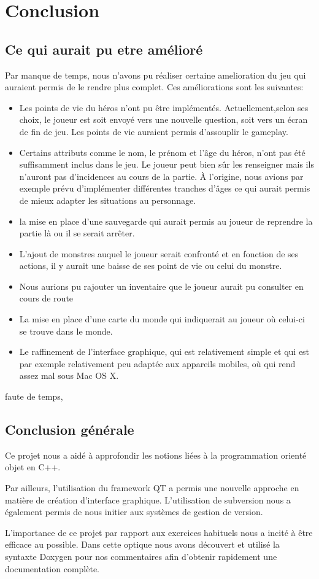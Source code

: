 \section{Conclusion}



\subsection{Ce qui aurait pu etre amélioré}

Par manque de temps, nous n'avons pu réaliser certaine amelioration du jeu qui auraient permis de le rendre plus complet. Ces améliorations sont les suivantes: 
\begin{itemize}
	\item Les points de vie du héros n'ont pu être implémentés. Actuellement,selon ses choix, le joueur est soit envoyé vers une nouvelle question, soit vers un écran de fin de jeu. Les points de vie auraient permis d'assouplir le gameplay.
	\item Certains attributs comme le nom, le prénom et l'âge du héros, n'ont pas été suffisamment inclus dans le jeu. Le joueur peut bien sûr les renseigner mais ils n'auront pas d'incidences au cours de la partie. À l'origine, nous avions par exemple prévu d'implémenter différentes tranches d'âges ce qui aurait permis de mieux adapter les situations au personnage.
	\item la mise en place d'une sauvegarde qui aurait permis au joueur de reprendre la partie là ou il se serait arrêter.
	\item L'ajout de monstres auquel le joueur serait confronté et en fonction de ses actions, il y aurait une baisse de ses point de vie ou celui du monstre.
	\item Nous aurions pu rajouter un inventaire que le joueur aurait pu consulter en cours de route
	\item La mise en place d'une carte du monde qui indiquerait au joueur où celui-ci se trouve dans le monde.
	\item Le raffinement de l'interface graphique, qui est relativement simple et qui est par exemple relativement peu adaptée aux appareils mobiles, où qui rend assez mal sous Mac OS X.
\end{itemize}
  

 faute de temps, 


\subsection{Conclusion générale}

Ce projet nous a aidé à approfondir les notions liées à la programmation orienté objet en C++.

Par ailleurs, l'utilisation du framework QT a permis une nouvelle approche en matière de création d'interface graphique. L'utilisation de subversion nous a également permis de nous initier aux systèmes de gestion de version.
 
L'importance de ce projet par rapport aux exercices habituels nous a incité à être efficace au possible. Dans cette optique nous avons découvert et utilisé la syntaxte Doxygen pour nos commentaires afin d'obtenir rapidement une documentation complète.
